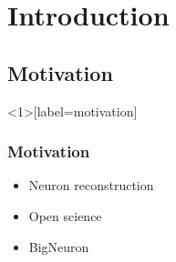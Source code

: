 \section{Introduction}
\subsection{Motivation}
\begin{frame}<1>[label=motivation]\frametitle{Motivation}
\begin{itemize}
	\item<1-> Neuron reconstruction
	\item<2-> Open science
	\item<3-> BigNeuron
\end{itemize}
\end{frame}

